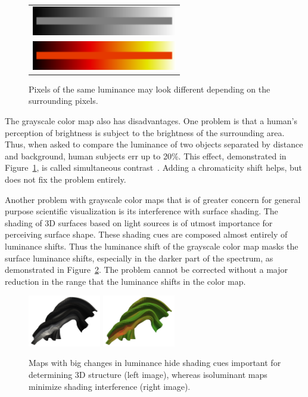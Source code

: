 \documentclass{acmsiggraph}               %
\newcommand{\lcite}[1]{~\cite{#1}}
\begin{document}
\begin{figure}
  \centering
  \begin{tabular}{c}
    \includegraphics[width=2.5in]{images/GrayscaleLocality} \\
    \includegraphics[width=2.5in]{images/BlackBodyLocality}
  \end{tabular}
  \caption{Pixels of the same luminance may look different depending on the
    surrounding pixels.}
  \label{fig:SimultaneousContrast}
\end{figure}
The grayscale color map also has disadvantages.  One problem is
that a human's perception of brightness is subject to the brightness of the
surrounding area.  Thus, when asked to compare the luminance of two objects
separated by distance and background, human subjects err up to 20\%.
This effect, demonstrated in Figure~\ref{fig:SimultaneousContrast}, is
called simultaneous contrast\lcite{Stone05}.  Adding a chromaticity shift
helps, but does not fix the problem entirely.

Another problem with grayscale color maps that is of greater concern for
general purpose scientific visualization is its interference with surface
shading.  The shading of 3D surfaces based on light sources is of utmost
importance for perceiving surface shape.  These shading cues are
composed almost entirely of luminance shifts.  Thus the luminance shift of
the grayscale color map masks the surface luminance shifts, especially in
the darker part of the spectrum, as demonstrated in
Figure~\ref{fig:LuminanceVsShading}.  The problem cannot be corrected
without a major reduction in the range that the luminance shifts in the color
map.

\begin{figure}
  \centering
  \includegraphics[width=1.25in]{images/GrayscaleShading}
  \includegraphics[width=1.25in]{images/IsoluminantShading}
  \caption{Maps with big changes in luminance hide shading cues important
    for determining 3D structure (left image), whereas isoluminant maps
    minimize shading interference (right image).}
  \label{fig:LuminanceVsShading}
\end{figure}
\end{document}
